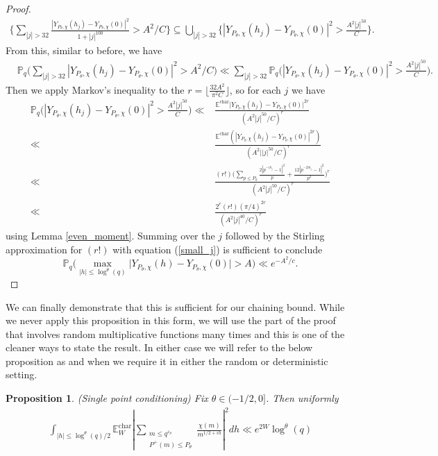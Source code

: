 \documentclass[10pt,a4paper]{amsart}
\newtheorem{proposition}{Proposition}[section]
\numberwithin{equation}{section}
\begin{document}
\begin{proof}
    \begin{align*}
        \big\{ \sum_{|j| > 32}\frac{|Y_{P_\theta,\chi}(h_j)-Y_{P_\theta,\chi}(0)|^2}{1+|j|^{100}} > A^2/C\big\} \subseteq \bigcup_{|j| > 32}\big\{|Y_{P_\theta,\chi}(h_j)-Y_{P_\theta,\chi}(0)|^2 > \frac{A^2|j|^{50}}{C}\big\}.
    \end{align*}
    From this, similar to before, we have
    \begin{align*}
        &\mathbb{P}_q\big(\sum_{|j| > 32}|Y_{P_\theta,\chi}(h_j)-Y_{P_\theta,\chi}(0)|^2 > A^2/C\big) \ll \sum_{|j| > 32}\mathbb{P}_q\big(|Y_{P_\theta,\chi}(h_j)-Y_{P_\theta,\chi}(0)|^2 > \frac{A^2|j|^{50}}{C}\big).
    \end{align*}
    Then we apply Markov's inequality to the $r=\lfloor\frac{32A^2}{\pi^2C}\rfloor$, so for each $j$ we have
    \begin{align*}
        \mathbb{P}_q\big(|Y_{P_\theta,\chi}(h_j)-Y_{P_\theta,\chi}(0)|^2 > \frac{A^2|j|^{50}}{C}\big) \ll& \frac{\mathbb{E}^{\text{char}}\big|Y_{P_\theta,\chi}(h_j)-Y_{P_\theta,\chi}(0)\big|^{2r}}{(A^2|j|^{50}/C)^r} \\
        \ll& \frac{\mathbb{E}^{\text{char}}(|Y_{P_\theta,\chi}(h_j)-Y_{P_\theta,\chi}(0)|^{2r})}{(A^2||j|^{50}/C)^{r}} \\ \ll& \frac{(r!)\big(\sum_{p \leq P_\theta}\frac{2|p^{-ih_j}-1|^2}{p}+\frac{12|p^{-2ih_j}-1|^2}{p^2}\big)^r}{(A^2|j|^{50}/C)^r} \\
        \ll& \frac{2^r(r!)(\pi/4)^{2r}}{(A^2|j|^{40}/C)^{r}}
    \end{align*}
    using Lemma \ref{even_moment}. Summing over the $j$ followed by the Stirling approximation for $(r!)$ with equation (\ref{small_j}) is sufficient to conclude
    $$\mathbb{P}_q\big(\max_{|h| \leq \log^{\theta}(q)}\big|Y_{P_\theta,\chi}(h)-Y_{P_\theta,\chi}(0) \big| > A\big) \ll e^{-A^2/c}.$$
\end{proof}
We can finally demonstrate that this is sufficient for our chaining bound. While we never apply this proposition in this form, we will use the part of the proof that involves random multiplicative functions many times and this is one of the cleaner ways to state the result. In either case we will refer to the below proposition as and when we require it in either the random or deterministic setting.
\begin{proposition}
    (Single point conditioning) Fix $\theta \in (-1/2,0]$. Then uniformly
    \begin{align*}
        \int_{|h| \leq \log^\theta(q)/2}\mathbb{E}_W^{\text{char}}|\sum_{\substack{m \leq q^{\varepsilon_\theta} \\ P^+(m) \leq P_\theta}}\frac{\chi(m)}{m^{1/2+ih}}|^2dh \ll e^{2W}\log^{\theta}(q)
    \end{align*} \label{chaining}
\end{proposition}
\end{document}
